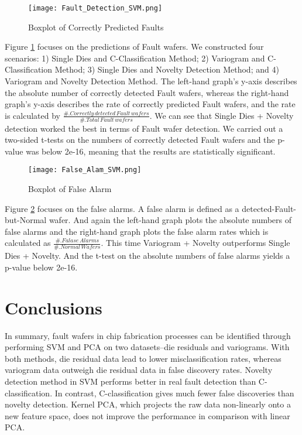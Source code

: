\documentclass[english]{article}
\numberwithin{equation}{section}
\numberwithin{table}{section}
\numberwithin{figure}{section}
\begin{document}
\begin{figure}
\begin{centering}
\texttt{[image: Fault\_Detection\_SVM.png]}
\par\end{centering}
\caption{Boxplot of Correctly Predicted Faults} \label{hh1}
\end{figure}


Figure \ref{hh1} focuses on the predictions of Fault wafers. We constructed
four scenarios: 1) Single Dies and C-Classification Method; 2) Variogram
and C-Classification Method; 3) Single Dies and Novelty Detection
Method; and 4) Variogram and Novelty Detection Method. The left-hand
graph's y-axis describes the absolute number of correctly detected
Fault wafers, whereas the right-hand graph's y-axis describes the
rate of correctly predicted Fault wafers, and the rate is calculated
by $\frac{\#.Correctly\, detected\, Fault\, wafers}{\#.Total\, Fault\, wafers}$.
We can see that Single Dies + Novelty detection worked the best in
terms of Fault wafer detection. We carried out a two-sided t-tests
on the numbers of correctly detected Fault wafers and the p-value
was below 2e-16, meaning that the results are statistically significant.

\begin{figure}
\begin{centering}
\texttt{[image: False\_Alam\_SVM.png]}
\par\end{centering}
\caption{Boxplot of False Alarm} \label{hh2}
\end{figure}


Figure \ref{hh2} focuses on the false alarms. A false alarm is defined as
a detected-Fault-but-Normal wafer. And again the left-hand graph plots
the absolute numbers of false alarms and the right-hand graph plots
the false alarm rates which is calculated as $\frac{\#.Falase\, Alarms}{\#.Normal\, Wafers}$.
This time Variogram + Novelty outperforms Single Dies + Novelty. And
the t-test on the absolute numbers of false alarms yields a p-value
below 2e-16. 



\section{Conclusions} \label{summary}
\hspace{12 pt}
In summary, fault wafers in chip fabrication processes can be identified
through performing SVM and PCA on two datasets--die residuals and
variograms. With both methods, die residual data lead to lower misclassification
rates, whereas variogram data outweigh die residual data in false
discovery rates. Novelty detection method in SVM performs better in
real fault detection than C-classification. In contrast, C-classification
gives much fewer false discoveries than novelty detection. Kernel
PCA, which projects the raw data non-linearly onto a new feature space,
does not improve the performance in comparison with linear PCA.
\end{document}
